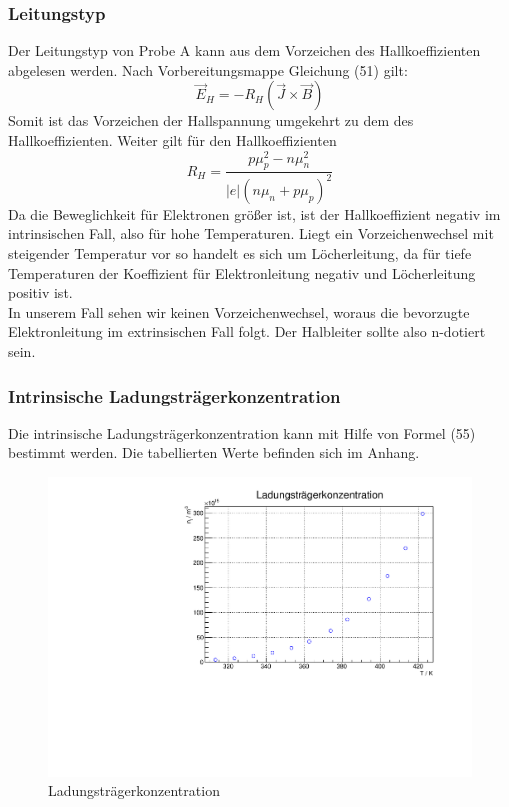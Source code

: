 \FloatBarrier
\subsubsection{Leitungstyp}

Der Leitungstyp von Probe A kann aus dem Vorzeichen des Hallkoeffizienten abgelesen werden. Nach Vorbereitungsmappe Gleichung (51) gilt:
$$\vec{E}_H = - R_H (\vec{J} \times \vec{B}) $$
Somit ist das Vorzeichen der Hallspannung umgekehrt zu dem des Hallkoeffizienten. Weiter gilt für den Hallkoeffizienten
$$R_H = \frac{p\mu_p^{2} - n \mu _n ^{2}}{\vert e \vert (n \mu _n + p \mu _p)^{2}} $$
Da die Beweglichkeit für Elektronen größer ist, ist der Hallkoeffizient negativ im intrinsischen Fall, also für hohe Temperaturen. Liegt ein Vorzeichenwechsel mit steigender Temperatur vor so handelt es sich um Löcherleitung, da für tiefe Temperaturen der Koeffizient für Elektronleitung negativ und Löcherleitung positiv ist. \\
In unserem Fall sehen wir keinen Vorzeichenwechsel, woraus die bevorzugte Elektronleitung im extrinsischen Fall folgt. Der Halbleiter sollte also n-dotiert sein.

\FloatBarrier
\subsubsection{Intrinsische Ladungsträgerkonzentration}
Die intrinsische Ladungsträgerkonzentration kann mit Hilfe von Formel (55) bestimmt werden. Die tabellierten Werte befinden sich im Anhang.

\begin{figure}
\label{fig:leitin}
\centering
\includegraphics[scale = 0.5]{../data/A4.pdf}
\caption{Ladungsträgerkonzentration}
\end{figure}




